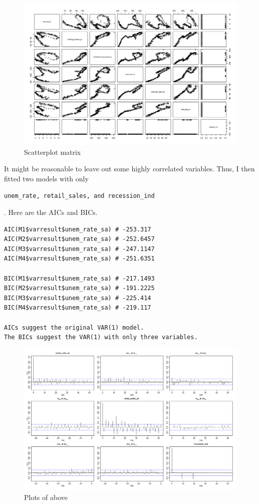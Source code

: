 \documentclass[twoside,twocolumn]{article}
\begin{document}
    \begin{figure}[H]
    	\centering
     	\caption{Scatterplot matrix}
     	\includegraphics[width=\linewidth]{images/varcorrelation}
 \end{figure}

It might be reasonable to leave out some highly correlated variables. Thus, I then fitted two models with only \begin{verbatim}unem_rate, retail_sales, and recession_ind\end{verbatim}. Here are the AICs and BICs.

\begin{verbatim}
AIC(M1$varresult$unem_rate_sa) # -253.317
AIC(M2$varresult$unem_rate_sa) # -252.6457
AIC(M3$varresult$unem_rate_sa) # -247.1147
AIC(M4$varresult$unem_rate_sa) # -251.6351

BIC(M1$varresult$unem_rate_sa) # -217.1493
BIC(M2$varresult$unem_rate_sa) # -191.2225
BIC(M3$varresult$unem_rate_sa) # -225.414
BIC(M4$varresult$unem_rate_sa) # -219.117

AICs suggest the original VAR(1) model. 
The BICs suggest the VAR(1) with only three variables. 
\end{verbatim}

    \begin{figure}[H]
    	\centering
     	\caption{Plots of above}
     	\includegraphics[width=\linewidth]{images/boplots}
 \end{figure}
\end{document}

